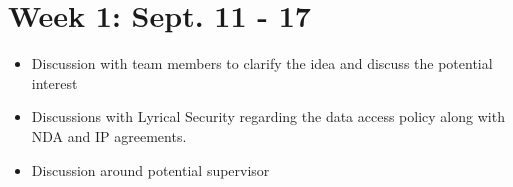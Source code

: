 \chapter{Week 1: Sept. 11 - 17}
\label{week:1}
\begin{itemize}
	\item Discussion with team members to clarify the idea and discuss the potential interest
	\item Discussions with Lyrical Security regarding the data access policy along with NDA and IP agreements.
   	\item Discussion around potential supervisor
\end{itemize}